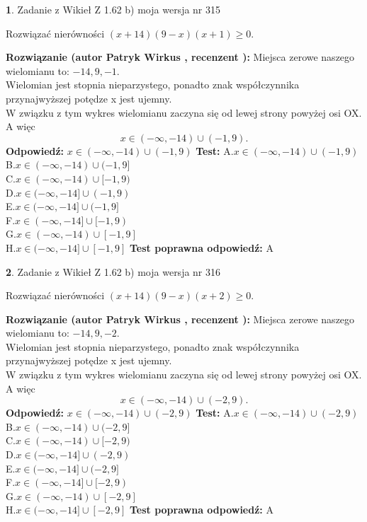 \documentclass[12pt, a4paper]{article}
\theoremstyle{definition} %
\newtheorem{zad}{}
\newcommand{\zadStart}[1]{\begin{zad}#1\newline}
\newcommand{\zadStop}{\end{zad}}
\newcommand{\rozwStart}[2]{\noindent \textbf{Rozwiązanie (autor #1 , recenzent #2): }\newline}
\newcommand{\rozwStop}{\newline}
\newcommand{\odpStart}{\noindent \textbf{Odpowiedź:}\newline}
\newcommand{\odpStop}{\newline}
\newcommand{\testStart}{\noindent \textbf{Test:}\newline}
\newcommand{\testStop}{\newline}
\newcommand{\kluczStart}{\noindent \textbf{Test poprawna odpowiedź:}\newline}
\newcommand{\kluczStop}{\newline}
\begin{document}
\zadStart{Zadanie z Wikieł Z 1.62 b) moja wersja nr 315}

Rozwiązać nierówności $(x+14)(9-x)(x+1)\ge0$.
\zadStop
\rozwStart{Patryk Wirkus}{}
Miejsca zerowe naszego wielomianu to: $-14, 9, -1$.\\
Wielomian jest stopnia nieparzystego, ponadto znak współczynnika przy\linebreak najwyższej potędze x jest ujemny.\\ W związku z tym wykres wielomianu zaczyna się od lewej strony powyżej osi OX. A więc $$x \in (-\infty,-14) \cup (-1,9).$$
\rozwStop
\odpStart
$x \in (-\infty,-14) \cup (-1,9)$
\odpStop
\testStart
A.$x \in (-\infty,-14) \cup (-1,9)$\\
B.$x \in (-\infty,-14) \cup (-1,9]$\\
C.$x \in (-\infty,-14) \cup [-1,9)$\\
D.$x \in (-\infty,-14] \cup (-1,9)$\\
E.$x \in (-\infty,-14] \cup (-1,9]$\\
F.$x \in (-\infty,-14] \cup [-1,9)$\\
G.$x \in (-\infty,-14) \cup [-1,9]$\\
H.$x \in (-\infty,-14] \cup [-1,9]$
\testStop
\kluczStart
A
\kluczStop



\zadStart{Zadanie z Wikieł Z 1.62 b) moja wersja nr 316}

Rozwiązać nierówności $(x+14)(9-x)(x+2)\ge0$.
\zadStop
\rozwStart{Patryk Wirkus}{}
Miejsca zerowe naszego wielomianu to: $-14, 9, -2$.\\
Wielomian jest stopnia nieparzystego, ponadto znak współczynnika przy\linebreak najwyższej potędze x jest ujemny.\\ W związku z tym wykres wielomianu zaczyna się od lewej strony powyżej osi OX. A więc $$x \in (-\infty,-14) \cup (-2,9).$$
\rozwStop
\odpStart
$x \in (-\infty,-14) \cup (-2,9)$
\odpStop
\testStart
A.$x \in (-\infty,-14) \cup (-2,9)$\\
B.$x \in (-\infty,-14) \cup (-2,9]$\\
C.$x \in (-\infty,-14) \cup [-2,9)$\\
D.$x \in (-\infty,-14] \cup (-2,9)$\\
E.$x \in (-\infty,-14] \cup (-2,9]$\\
F.$x \in (-\infty,-14] \cup [-2,9)$\\
G.$x \in (-\infty,-14) \cup [-2,9]$\\
H.$x \in (-\infty,-14] \cup [-2,9]$
\testStop
\kluczStart
A
\kluczStop
\end{document}
